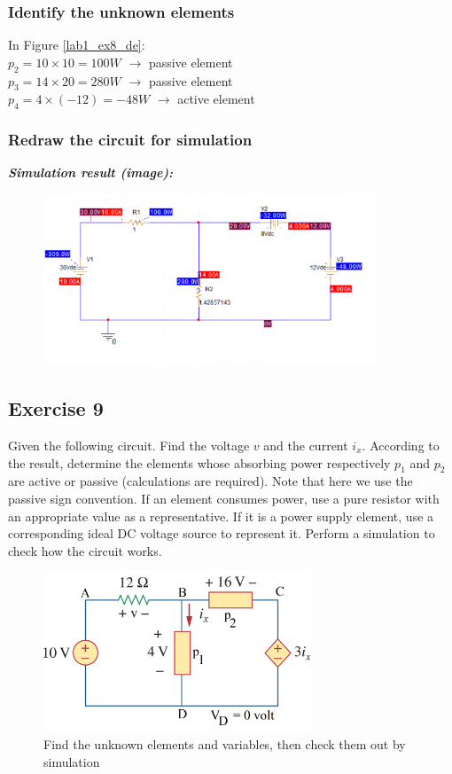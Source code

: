 \subsubsection{Identify the unknown elements}
In Figure \ref{lab1_ex8_de}:\bigskip\\
$p_2 = 10 \times 10 = 100 W$  $\longrightarrow$  passive element\bigskip\\
$p_3 = 14 \times 20 = 280 W$  $\longrightarrow$ passive element\bigskip\\
$p_4 = 4 \times (-12) = -48W$  $\longrightarrow$ active element\bigskip\\

\subsubsection{Redraw the circuit for simulation}
\textit{\textbf{Simulation result (image):}}
\begin{figure}[H]
    \centering
    \includegraphics[width = 10cm]{source/picture/bai_1/ex8_sim.png}
    \label{ex8_rearrange}
\end{figure}
\newpage

\subsection{Exercise 9}
Given the following circuit. Find the voltage $v$ and the current $i_x$. According to the result, determine the elements whose absorbing power respectively $p_1$ and $p_2$ are active or passive (calculations are required). Note that here we use the passive sign convention. If an element consumes power, use a pure resistor with an appropriate value as a representative. If it is a  power supply element, use a corresponding ideal DC voltage source to represent it. Perform a simulation to check how the circuit works.

\begin{figure}[H]
    \centering
    \includegraphics[width=8cm]{source/picture/bai_1/lab1_ex9_de.png}
    \caption{Find the unknown elements and variables, then check them out by simulation}
    \label{lab1_ex9_de}
\end{figure}

